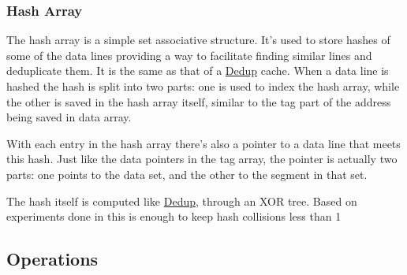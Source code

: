 \subsubsection{Hash Array}
\label{sssec:DedupBDIHash}
The hash array is a simple set associative structure. It's used to store hashes of some of the data lines providing a way to facilitate finding similar lines and deduplicate them. It is the same as that of a \hyperref[sssec:DedupHash]{Dedup} cache. When a data line is hashed the hash is split into two parts: one is used to index the hash array, while the other is saved in the hash array itself, similar to the tag part of the address being saved in data array.\par
With each entry in the hash array there's also a pointer to a data line that meets this hash. Just like the data pointers in the tag array, the pointer is actually two parts: one points to the data set, and the other to the segment in that set.\par
The hash itself is computed like \hyperref[sssec:DedupHash]{Dedup}, through an XOR tree. Based on experiments done in \cite{dedup} this is enough to keep hash collisions less than 1%

\subsection{Operations}
\label{ssec:DedupBDIOperations}

